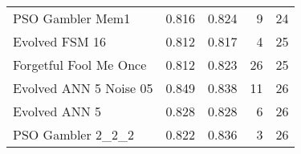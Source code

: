 \begin{tabular}{lrrrr}
PSO Gambler Mem1           &                               0.816 &                            0.824 &             9 &    24 \\
Evolved FSM 16             &                               0.812 &                            0.817 &             4 &    25 \\
Forgetful Fool Me Once     &                               0.812 &                            0.823 &            26 &    25 \\
Evolved ANN 5 Noise 05     &                               0.849 &                            0.838 &            11 &    26 \\
Evolved ANN 5              &                               0.828 &                            0.828 &             6 &    26 \\
PSO Gambler 2\_2\_2          &                               0.822 &                            0.836 &             3 &    26 \\
\bottomrule
\end{tabular}
